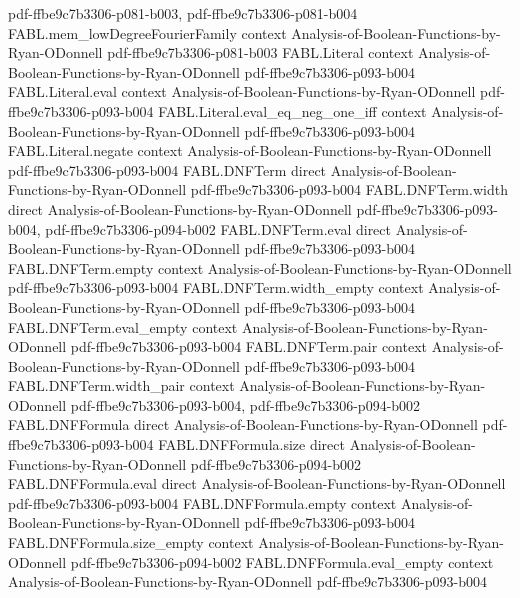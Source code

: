 \begin{theorem}
  {pdf-ffbe9c7b3306-p081-b003,
    pdf-ffbe9c7b3306-p081-b004}
\proofstep
  {FABL.mem_lowDegreeFourierFamily}
  {context}
  {Analysis-of-Boolean-Functions-by-Ryan-ODonnell}
  {pdf-ffbe9c7b3306-p081-b003}
\proofstep
  {FABL.Literal}
  {context}
  {Analysis-of-Boolean-Functions-by-Ryan-ODonnell}
  {pdf-ffbe9c7b3306-p093-b004}
\proofstep
  {FABL.Literal.eval}
  {context}
  {Analysis-of-Boolean-Functions-by-Ryan-ODonnell}
  {pdf-ffbe9c7b3306-p093-b004}
\proofstep
  {FABL.Literal.eval_eq_neg_one_iff}
  {context}
  {Analysis-of-Boolean-Functions-by-Ryan-ODonnell}
  {pdf-ffbe9c7b3306-p093-b004}
\proofstep
  {FABL.Literal.negate}
  {context}
  {Analysis-of-Boolean-Functions-by-Ryan-ODonnell}
  {pdf-ffbe9c7b3306-p093-b004}
\proofstep
  {FABL.DNFTerm}
  {direct}
  {Analysis-of-Boolean-Functions-by-Ryan-ODonnell}
  {pdf-ffbe9c7b3306-p093-b004}
\proofstep
  {FABL.DNFTerm.width}
  {direct}
  {Analysis-of-Boolean-Functions-by-Ryan-ODonnell}
  {pdf-ffbe9c7b3306-p093-b004,
    pdf-ffbe9c7b3306-p094-b002}
\proofstep
  {FABL.DNFTerm.eval}
  {direct}
  {Analysis-of-Boolean-Functions-by-Ryan-ODonnell}
  {pdf-ffbe9c7b3306-p093-b004}
\proofstep
  {FABL.DNFTerm.empty}
  {context}
  {Analysis-of-Boolean-Functions-by-Ryan-ODonnell}
  {pdf-ffbe9c7b3306-p093-b004}
\proofstep
  {FABL.DNFTerm.width_empty}
  {context}
  {Analysis-of-Boolean-Functions-by-Ryan-ODonnell}
  {pdf-ffbe9c7b3306-p093-b004}
\proofstep
  {FABL.DNFTerm.eval_empty}
  {context}
  {Analysis-of-Boolean-Functions-by-Ryan-ODonnell}
  {pdf-ffbe9c7b3306-p093-b004}
\proofstep
  {FABL.DNFTerm.pair}
  {context}
  {Analysis-of-Boolean-Functions-by-Ryan-ODonnell}
  {pdf-ffbe9c7b3306-p093-b004}
\proofstep
  {FABL.DNFTerm.width_pair}
  {context}
  {Analysis-of-Boolean-Functions-by-Ryan-ODonnell}
  {pdf-ffbe9c7b3306-p093-b004,
    pdf-ffbe9c7b3306-p094-b002}
\proofstep
  {FABL.DNFFormula}
  {direct}
  {Analysis-of-Boolean-Functions-by-Ryan-ODonnell}
  {pdf-ffbe9c7b3306-p093-b004}
\proofstep
  {FABL.DNFFormula.size}
  {direct}
  {Analysis-of-Boolean-Functions-by-Ryan-ODonnell}
  {pdf-ffbe9c7b3306-p094-b002}
\proofstep
  {FABL.DNFFormula.eval}
  {direct}
  {Analysis-of-Boolean-Functions-by-Ryan-ODonnell}
  {pdf-ffbe9c7b3306-p093-b004}
\proofstep
  {FABL.DNFFormula.empty}
  {context}
  {Analysis-of-Boolean-Functions-by-Ryan-ODonnell}
  {pdf-ffbe9c7b3306-p093-b004}
\proofstep
  {FABL.DNFFormula.size_empty}
  {context}
  {Analysis-of-Boolean-Functions-by-Ryan-ODonnell}
  {pdf-ffbe9c7b3306-p094-b002}
\proofstep
  {FABL.DNFFormula.eval_empty}
  {context}
  {Analysis-of-Boolean-Functions-by-Ryan-ODonnell}
  {pdf-ffbe9c7b3306-p093-b004}

\end{theorem}

